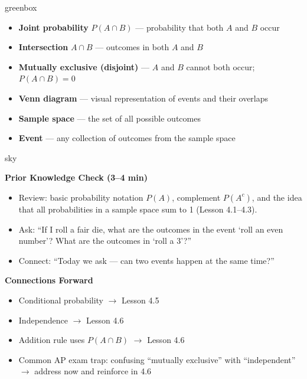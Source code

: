 \documentclass[10pt]{article}
\begin{document}
\begin{skillbox}{greenbox}
\begin{minipage}[t]{0.48\linewidth}
    \begin{itemize}
        \item \textbf{Joint probability} $P(A \cap B)$ --- probability that both $A$ and $B$ occur
        \item \textbf{Intersection} $A \cap B$ --- outcomes in both $A$ and $B$
        \item \textbf{Mutually exclusive (disjoint)} --- $A$ and $B$ cannot both occur;
              $P(A \cap B) = 0$
    \end{itemize}
\end{minipage}
\hfill
\begin{minipage}[t]{0.48\linewidth}
    \begin{itemize}
        \item \textbf{Venn diagram} --- visual representation of events and their overlaps
        \item \textbf{Sample space} --- the set of all possible outcomes
        \item \textbf{Event} --- any collection of outcomes from the sample space
    \end{itemize}
\end{minipage}
\end{skillbox}

\begin{skillbox}{sky}
\begin{minipage}[t]{0.48\linewidth}
    \textbf{Prior Knowledge Check (3--4 min)}
    \begin{itemize}
        \item Review: basic probability notation $P(A)$, complement $P(A^c)$, and
              the idea that all probabilities in a sample space sum to 1 (Lesson 4.1--4.3).
        \item Ask: ``If I roll a fair die, what are the outcomes in the event
              `roll an even number'? What are the outcomes in `roll a 3'?''
        \item Connect: ``Today we ask --- can two events happen at the same time?''
    \end{itemize}
\end{minipage}
\hfill
\begin{minipage}[t]{0.48\linewidth}
    \textbf{Connections Forward}
    \begin{itemize}
        \item Conditional probability $\to$ Lesson 4.5
        \item Independence $\to$ Lesson 4.6
        \item Addition rule uses $P(A \cap B)$ $\to$ Lesson 4.6
        \item Common AP exam trap: confusing ``mutually exclusive'' with
              ``independent'' $\to$ address now and reinforce in 4.6
    \end{itemize}
\end{minipage}
\end{skillbox}
\end{document}
